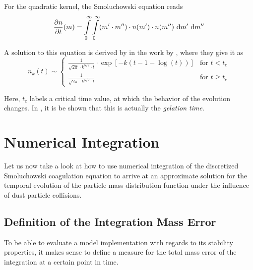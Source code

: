    For the quadratic kernel, the Smoluchowski equation reads
    \begin{equation}
        \frac{\partial n}{\partial t}(m)
            = 
                \int\limits_0^\infty \int\limits_0^\infty
                (m' \cdot m'') \cdot
                n(m') \cdot n(m'')
                \ \text{d} m' \ \text{d} m''
        \label{eq:smoluchowski_with_quadratic_kernel}
    \end{equation}

    A solution to this equation is derived by in the work by \cite{wattis_2006}, 
    where they give it as 
    \begin{equation}
        n_k(t) \sim \begin{cases} 
            \frac{ 1 }{ \sqrt{2\pi} \cdot k^{5/2}\cdot t } \cdot \exp[-k(t-1-\log(t))]
            & \text{for } t < t_c
            \\
            \frac{ 1 }{ \sqrt{2\pi} \cdot k^{5/2}\cdot t }
            & \text{for } t \geq t_c
        \end{cases}
    \end{equation}

    Here, $t_c$ labels a critical time value, at which the behavior of the evolution changes.
    In \cite{wattis_2006}, it is be shown that this is actually the \textit{gelation time}.


\clearpage\section{Numerical Integration}

    Let us now take a look at how to use numerical integration of the discretized 
    Smoluchowski coagulation equation to arrive at an approximate solution for the temporal 
    evolution of the particle mass distribution function under the influence of dust particle 
    collisions. 

    \subsection{Definition of the Integration Mass Error}

        To be able to evaluate a model implementation with regards to its stability properties,
        it makes sense to define a measure for the total mass error of the integration at 
        a certain point in time. \\

